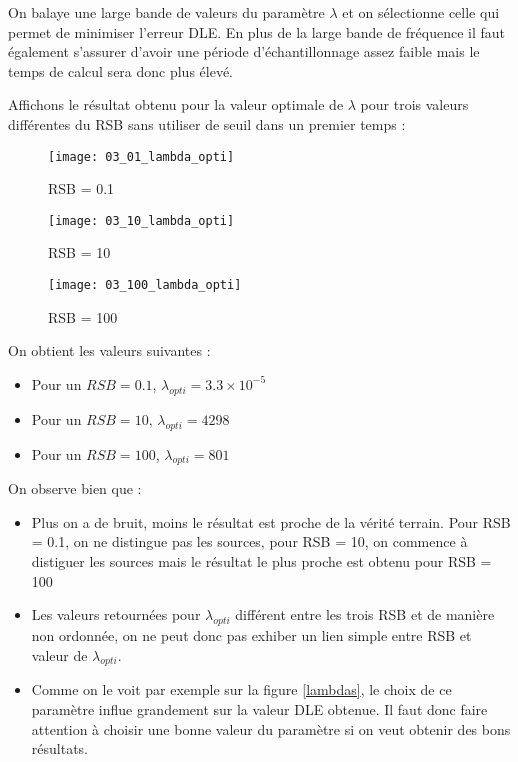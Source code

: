 \documentclass[12pt,a4paper,titlepage]{article}
\begin{document}
On balaye une large bande de valeurs du paramètre $\lambda$ et on
sélectionne celle qui permet de minimiser l'erreur DLE. En plus de la large
bande de fréquence il faut également s'assurer d'avoir une période d'échantillonnage
assez faible mais le temps de calcul sera donc plus élevé.

Affichons le résultat obtenu pour la valeur optimale de $\lambda$
pour trois valeurs différentes du RSB sans utiliser de seuil dans un premier
temps :

\begin{figure}[H]
    \caption{RSB = 0.1}
    \texttt{[image: 03\_01\_lambda\_opti]}
    \centering
\end{figure}

\begin{figure}[H]
    \caption{RSB = 10}
    \texttt{[image: 03\_10\_lambda\_opti]}
    \centering
\end{figure}

\begin{figure}[H]
    \caption{RSB = 100}
    \texttt{[image: 03\_100\_lambda\_opti]}
    \centering
\end{figure}

On obtient les valeurs suivantes :

\begin{itemize}
    \item{Pour un $RSB = 0.1$, $ \lambda_{opti} = 3.3 \times 10^{-5} $}
    \item{Pour un $RSB = 10$, $ \lambda_{opti} = 4298 $}
    \item{Pour un $RSB = 100$, $ \lambda_{opti} = 801 $}
\end{itemize}

On observe bien que :

\begin{itemize}
    \item{Plus on a de bruit, moins le résultat est proche de la vérité terrain.
        Pour RSB = 0.1, on ne distingue pas les sources, pour RSB = 10, on commence à distiguer
        les sources mais le résultat le plus proche est obtenu pour RSB = 100}
    \item{Les valeurs retournées pour $\lambda_{opti}$ différent entre les trois RSB et de manière non ordonnée,
        on ne peut donc pas exhiber un lien simple entre RSB et valeur de $\lambda_{opti}$.}
    \item{Comme on le voit par exemple sur la figure \ref{lambdas}, le choix de ce paramètre
        influe grandement sur la valeur DLE obtenue. Il faut donc faire attention à choisir une bonne valeur du paramètre
        si on veut obtenir des bons résultats.}
\end{itemize}
\end{document}
